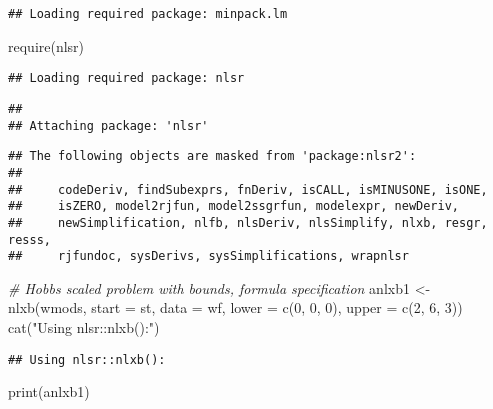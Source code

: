 \documentclass[
]{article}
\newenvironment{Shaded}{\begin{snugshade}}{\end{snugshade}}
\newcommand{\AttributeTok}[1]{\textcolor[rgb]{0.77,0.63,0.00}{#1}}
\newcommand{\CommentTok}[1]{\textcolor[rgb]{0.56,0.35,0.01}{\textit{#1}}}
\newcommand{\DecValTok}[1]{\textcolor[rgb]{0.00,0.00,0.81}{#1}}
\newcommand{\FunctionTok}[1]{\textcolor[rgb]{0.00,0.00,0.00}{#1}}
\newcommand{\NormalTok}[1]{#1}
\newcommand{\OtherTok}[1]{\textcolor[rgb]{0.56,0.35,0.01}{#1}}
\newcommand{\StringTok}[1]{\textcolor[rgb]{0.31,0.60,0.02}{#1}}
\begin{document}
\begin{verbatim}
## Loading required package: minpack.lm
\end{verbatim}

\begin{Shaded}
\begin{Highlighting}[]
\FunctionTok{require}\NormalTok{(nlsr)}
\end{Highlighting}
\end{Shaded}

\begin{verbatim}
## Loading required package: nlsr
\end{verbatim}

\begin{verbatim}
## 
## Attaching package: 'nlsr'
\end{verbatim}

\begin{verbatim}
## The following objects are masked from 'package:nlsr2':
## 
##     codeDeriv, findSubexprs, fnDeriv, isCALL, isMINUSONE, isONE,
##     isZERO, model2rjfun, model2ssgrfun, modelexpr, newDeriv,
##     newSimplification, nlfb, nlsDeriv, nlsSimplify, nlxb, resgr, resss,
##     rjfundoc, sysDerivs, sysSimplifications, wrapnlsr
\end{verbatim}

\begin{Shaded}
\begin{Highlighting}[]
\CommentTok{\# Hobbs scaled problem with bounds, formula specification}
\NormalTok{anlxb1 }\OtherTok{\textless{}{-}} \FunctionTok{nlxb}\NormalTok{(wmods, }\AttributeTok{start =}\NormalTok{ st, }\AttributeTok{data =}\NormalTok{ wf, }\AttributeTok{lower =} \FunctionTok{c}\NormalTok{(}\DecValTok{0}\NormalTok{, }\DecValTok{0}\NormalTok{, }\DecValTok{0}\NormalTok{), }\AttributeTok{upper =} \FunctionTok{c}\NormalTok{(}\DecValTok{2}\NormalTok{, }\DecValTok{6}\NormalTok{, }\DecValTok{3}\NormalTok{))}
\FunctionTok{cat}\NormalTok{(}\StringTok{"Using nlsr::nlxb():"}\NormalTok{)}
\end{Highlighting}
\end{Shaded}

\begin{verbatim}
## Using nlsr::nlxb():
\end{verbatim}

\begin{Shaded}
\begin{Highlighting}[]
\FunctionTok{print}\NormalTok{(anlxb1)}
\end{Highlighting}
\end{Shaded}
\end{document}
